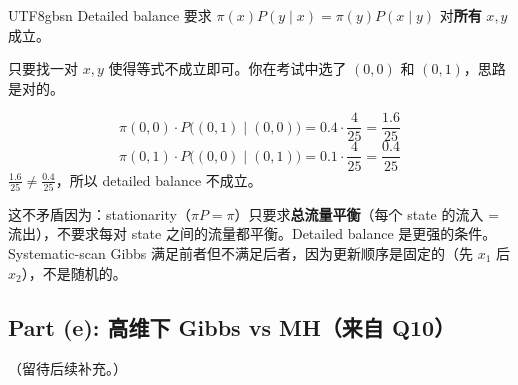 \documentclass[11pt]{article}
\begin{document}
\begin{CJK}{UTF8}{gbsn}
Detailed balance 要求 $\pi(x) P(y \mid x) = \pi(y) P(x \mid y)$ 对\textbf{所有} $x, y$ 成立。

只要找一对 $x, y$ 使得等式不成立即可。你在考试中选了 $(0,0)$ 和 $(0,1)$，思路是对的。

\[
  \pi(0,0) \cdot P\big((0,1) \mid (0,0)\big) = 0.4 \cdot \frac{4}{25} = \frac{1.6}{25}
\]
\[
  \pi(0,1) \cdot P\big((0,0) \mid (0,1)\big) = 0.1 \cdot \frac{4}{25} = \frac{0.4}{25}
\]
$\frac{1.6}{25} \neq \frac{0.4}{25}$，所以 detailed balance 不成立。

这不矛盾因为：stationarity（$\pi P = \pi$）只要求\textbf{总流量平衡}（每个 state 的流入 = 流出），不要求每对 state 之间的流量都平衡。Detailed balance 是更强的条件。Systematic-scan Gibbs 满足前者但不满足后者，因为更新顺序是固定的（先 $x_1$ 后 $x_2$），不是随机的。

\subsection{Part (e): 高维下 Gibbs vs MH（来自 Q10）}

（留待后续补充。）


\end{CJK}
\end{document}
